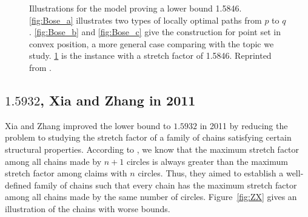 \begin{figure}[ht]
\begin{subfigure}[b]{0.475\textwidth}
            \caption[]%
            {}    
            \label{fig:Bose_d}
        \end{subfigure}
        \caption[Illustrations for the model proving a lower bound 1.5846]{Illustrations for the model proving a lower bound 1.5846. \ref{fig:Bose_a} illustrates two types of locally optimal paths from $p$ to $q$.  \ref{fig:Bose_b} and  \ref{fig:Bose_c} give the construction for point set in convex position, a more general case comparing with the topic we study.  \ref{fig:Bose_d} is the instance with a stretch factor of 1.5846. Reprinted from \cite{BoseCGTA}.} 
        \label{fig:Bose}
    \end{figure}





\subsection{\texorpdfstring{$1.5932$}{Lg}, Xia and Zhang in 2011}
Xia and Zhang\cite{fwcg2010} improved the lower bound to  $1.5932$ in  2011 by reducing the problem to studying the stretch factor of a family of chains satisfying certain structural properties. According to  \cite{dobkin}, we know that the maximum stretch factor among all chains made by $n+1$ circles is always greater than the maximum stretch factor among claims with  $n$ circles. Thus, they aimed to establish a well-defined family of chains such that every chain has the maximum stretch factor among all chains made by the same number of circles.
Figure~\ref{fig:ZX} gives an illustration of the chains with worse bounds.




